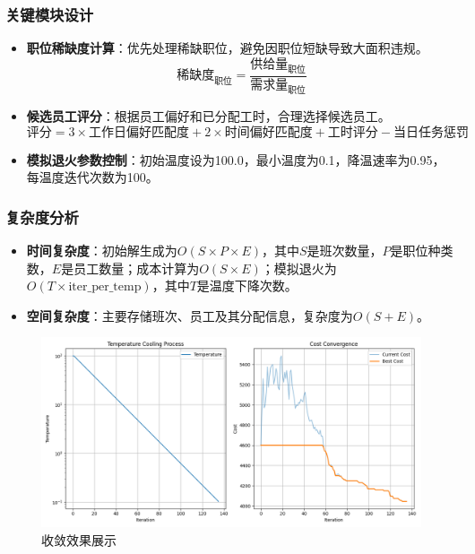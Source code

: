 \documentclass{ctexart}
\begin{document}
\subsubsection{关键模块设计}
\begin{itemize}
    \item \textbf{职位稀缺度计算}：优先处理稀缺职位，避免因职位短缺导致大面积违规。
    \begin{equation}
    \text{稀缺度}_{\text{职位}} = \frac{\text{供给量}_{\text{职位}}}{\text{需求量}_{\text{职位}}}
    \end{equation}
    
    \item \textbf{候选员工评分}：根据员工偏好和已分配工时，合理选择候选员工。
    \begin{equation}
    \text{评分} = 3 \times \text{工作日偏好匹配度} + 2 \times \text{时间偏好匹配度} + \text{工时评分} - \text{当日任务惩罚}
    \end{equation}
    
    \item \textbf{模拟退火参数控制}：初始温度设为100.0，最小温度为0.1，降温速率为0.95，每温度迭代次数为100。
\end{itemize}

\subsubsection{复杂度分析}
\begin{itemize}
    \item \textbf{时间复杂度}：初始解生成为$O(S \times P \times E)$，其中$S$是班次数量，$P$是职位种类数，$E$是员工数量；成本计算为$O(S \times E)$；模拟退火为$O(T \times \text{iter\_per\_temp})$，其中$T$是温度下降次数。
    
    \item \textbf{空间复杂度}：主要存储班次、员工及其分配信息，复杂度为$O(S + E)$。
\end{itemize}

\begin{figure}[H]
    \centering
    \includegraphics[width=0.8\linewidth]{./source/收敛效果展示.png}
    \caption{收敛效果展示}
    \label{fig:microservice-arch}
\end{figure}
\end{document}
